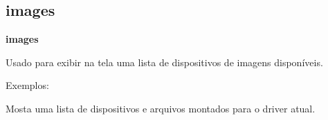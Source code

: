\documentclass[letterpaper,10pt,brazil]{sphinxmanual}
\begin{document}
\subsection{images}
\label{debugger/image:images}\label{debugger/image:debugger-command-images}
\begin{DUlineblock}{0em}
\item[]
\begin{DUlineblock}{\DUlineblockindent}
\item[] \textbf{images}
\item[] 
\end{DUlineblock}
\item[] Usado para exibir na tela uma lista de dispositivos de imagens disponíveis.
\item[] 
\item[] Exemplos:
\item[] 
\item[]
\begin{DUlineblock}{\DUlineblockindent}
\item[] 
\item[] 
\end{DUlineblock}
\item[] Mosta uma lista de dispositivos e arquivos montados para o driver atual.
\end{DUlineblock}
\begin{quote}
\label{debugger/image:debugger-command-mount}\end{quote}
\end{document}
